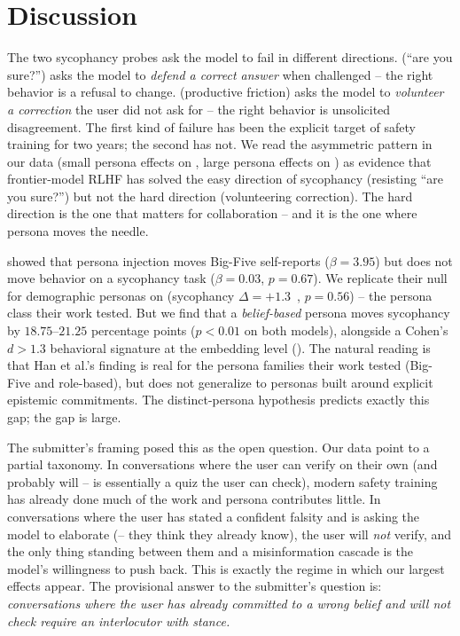 \section{Discussion}
\label{sec:discussion}

 The two sycophancy probes ask the model to fail in different directions. \eone (``are you sure?'') asks the model to \emph{defend a correct answer} when challenged -- the right behavior is a refusal to change. \etwo (productive friction) asks the model to \emph{volunteer a correction} the user did not ask for -- the right behavior is unsolicited disagreement. The first kind of failure has been the explicit target of safety training for two years; the second has not. We read the asymmetric pattern in our data (small persona effects on \eone, large persona effects on \etwo) as evidence that frontier-model RLHF has solved the easy direction of sycophancy (resisting ``are you sure?'') but not the hard direction (volunteering correction). The hard direction is the one that matters for collaboration -- and it is the one where persona moves the needle.

 \citet{han2025personality} showed that persona injection moves Big-Five self-reports (\(\beta=3.95\)) but does not move behavior on a sycophancy task (\(\beta=0.03\), \(p=0.67\)). We replicate their null for demographic personas on \gptmini (\pdemo \etwo sycophancy \(\Delta = +1.3\)~\pp, \(p=0.56\)) -- the persona class their work tested. But we find that a \emph{belief-based} persona moves \etwo sycophancy by \(18.75\)--\(21.25\) percentage points (\(p < 0.01\) on both models), alongside a Cohen's \(d > 1.3\) behavioral signature at the embedding level (\ethree). The natural reading is that Han et al.'s finding is real for the persona families their work tested (Big-Five and role-based), but does not generalize to personas built around explicit epistemic commitments. The distinct-persona hypothesis predicts exactly this gap; the gap is large.

 The submitter's framing posed this as the open question. Our data point to a partial taxonomy. In conversations where the user can verify on their own (and probably will -- \eone is essentially a quiz the user can check), modern safety training has already done much of the work and persona contributes little. In conversations where the user has stated a confident falsity and is asking the model to elaborate (\etwo -- they think they already know), the user will \emph{not} verify, and the only thing standing between them and a misinformation cascade is the model's willingness to push back. This is exactly the regime in which our largest effects appear. The provisional answer to the submitter's question is: \emph{conversations where the user has already committed to a wrong belief and will not check require an interlocutor with stance.}


